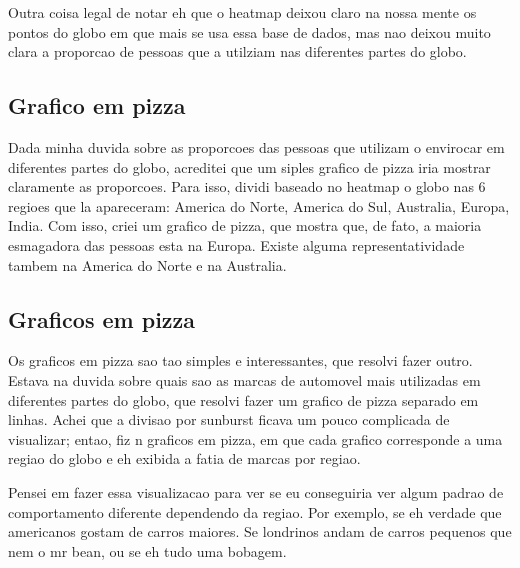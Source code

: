 \documentclass[10pt, conference]{IEEEtran}
\begin{document}
Outra coisa legal de notar eh que o heatmap deixou claro na nossa mente os pontos do globo em que 
mais se usa essa base de dados, mas nao deixou muito clara a proporcao de pessoas que a utilziam
nas diferentes partes do globo.



\subsection{Grafico em pizza}

Dada minha duvida sobre as proporcoes das pessoas que utilizam o envirocar em diferentes partes do globo,
acreditei que um siples grafico de pizza iria mostrar claramente as proporcoes. Para isso, dividi
baseado no heatmap o globo nas 6 regioes que la apareceram: America do Norte, America do Sul,
Australia, Europa, India. Com isso, criei um grafico de pizza, que mostra que, de fato, a maioria esmagadora
das pessoas esta na Europa. Existe alguma representatividade tambem na America do Norte e na Australia.




\subsection{Graficos em pizza}

Os graficos em pizza sao tao simples e interessantes, que resolvi fazer outro. Estava na duvida sobre quais
sao as marcas de automovel mais utilizadas em diferentes partes do globo, que resolvi fazer um grafico de 
pizza separado em linhas. Achei que a divisao por sunburst ficava um pouco complicada de visualizar; entao, fiz n graficos
em pizza, em que cada grafico corresponde a uma regiao do globo e eh exibida a fatia de marcas por regiao.

Pensei em fazer essa visualizacao para ver se eu conseguiria ver algum padrao de comportamento diferente
dependendo da regiao. Por exemplo, se eh verdade que americanos gostam de carros maiores. Se londrinos andam de
carros pequenos que nem o mr bean, ou se eh tudo uma bobagem.
\end{document}

